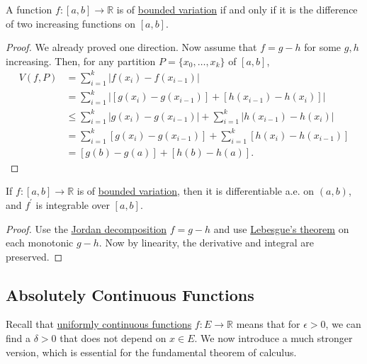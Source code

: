   \begin{theorem}
    \label{thm:jordans-theorem}
    A function $f: [a, b] \to \mathbb{R}$ is of \hyperref[def:bounded-variation]{bounded variation} if and only if it is the difference of two increasing functions on $[a, b]$. 
  \end{theorem}
  \begin{proof}
    We already proved one direction. Now assume that $f = g - h$ for some $g, h$ increasing. Then, for any partition $P = \{x_0, \ldots, x_k\}$ of $[a, b]$, 
    \begin{align}
      V(f, P) &= \sum_{i=1}^{k} |f(x_i) - f(x_{i-1})| \\ 
              &= \sum_{i=1}^{k} |[g(x_i) - g(x_{i-1})] + [h(x_{i-1}) - h(x_i)]| \\
              &\leq \sum_{i=1}^{k} |g(x_i) - g(x_{i-1})| + \sum_{i=1}^{k} |h(x_{i-1}) - h(x_i)| \\
              &= \sum_{i=1}^{k} [g(x_i) - g(x_{i-1})] + \sum_{i=1}^{k} [h(x_i) - h(x_{i-1})] \\
              &= [g(b) - g(a)] + [h(b) - h(a)].
    \end{align}
  \end{proof}

  \begin{corollary}
    \label{thm:bounded-variation-implies-differentiability-a-e}
    If $f: [a, b] \to \mathbb{R}$ is of \hyperref[def:bounded-variation]{bounded variation}, then it is differentiable a.e. on $(a, b)$, and $f^\prime$ is integrable over $[a, b]$. 
  \end{corollary}
  \begin{proof}
    Use the \hyperref[thm:jordan-decomposition-theorem]{Jordan decomposition} $f = g - h$ and use \hyperref[thm:lebesgues-theorem]{Lebesgue's theorem} on each monotonic $g - h$. Now by linearity, the derivative and integral are preserved. 
  \end{proof}

\subsection{Absolutely Continuous Functions} 

  Recall that \hyperref[real-def:uniform-continuity]{uniformly continuous functions} $f: E \to \mathbb{R}$ means that for $\epsilon > 0$, we can find a $\delta > 0$ that does not depend on $x \in E$. We now introduce a much stronger version, which is essential for the fundamental theorem of calculus. 

